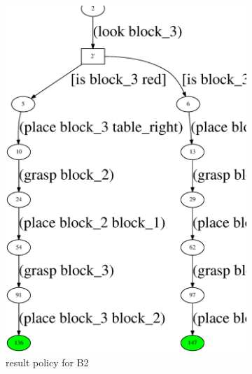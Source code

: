 \documentclass[conference]{IEEEtran}
\begin{document}
\begin{figure}[h!]
  \centering
  \hfill
  \begin{subfigure}[t]{0.32\textwidth}
      \includegraphics[width=\textwidth]{data/2m1/-0.015/10/policy-11-final-arranged.eps}
  \caption{result policy for B2}
  \end{subfigure}
  \hfill
  \begin{subfigure}[t]{0.16\textwidth}

\end{subfigure}
\end{figure}
\end{document}
